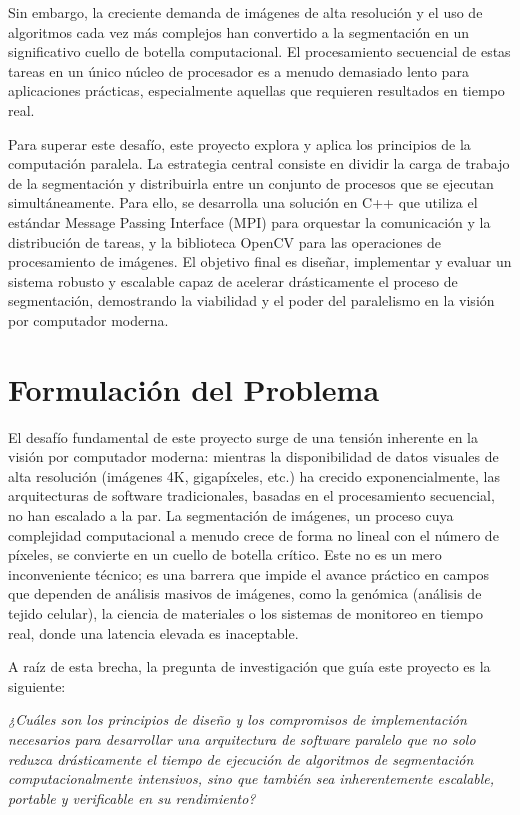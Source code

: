 \documentclass[fleqn,10pt]{article}
\begin{document}
Sin embargo, la creciente demanda de imágenes de alta resolución y el uso de algoritmos cada vez más complejos han convertido a la segmentación en un significativo cuello de botella computacional. El procesamiento secuencial de estas tareas en un único núcleo de procesador es a menudo demasiado lento para aplicaciones prácticas, especialmente aquellas que requieren resultados en tiempo real.

Para superar este desafío, este proyecto explora y aplica los principios de la computación paralela. La estrategia central consiste en dividir la carga de trabajo de la segmentación y distribuirla entre un conjunto de procesos que se ejecutan simultáneamente. Para ello, se desarrolla una solución en C++ que utiliza el estándar Message Passing Interface (MPI) para orquestar la comunicación y la distribución de tareas, y la biblioteca OpenCV para las operaciones de procesamiento de imágenes. El objetivo final es diseñar, implementar y evaluar un sistema robusto y escalable capaz de acelerar drásticamente el proceso de segmentación, demostrando la viabilidad y el poder del paralelismo en la visión por computador moderna.

\clearpage
\section{Formulación del Problema}
El desafío fundamental de este proyecto surge de una tensión inherente en la visión por computador moderna: mientras la disponibilidad de datos visuales de alta resolución (imágenes 4K, gigapíxeles, etc.) ha crecido exponencialmente, las arquitecturas de software tradicionales, basadas en el procesamiento secuencial, no han escalado a la par. La segmentación de imágenes, un proceso cuya complejidad computacional a menudo crece de forma no lineal con el número de píxeles, se convierte en un cuello de botella crítico. Este no es un mero inconveniente técnico; es una barrera que impide el avance práctico en campos que dependen de análisis masivos de imágenes, como la genómica (análisis de tejido celular), la ciencia de materiales o los sistemas de monitoreo en tiempo real, donde una latencia elevada es inaceptable.

A raíz de esta brecha, la pregunta de investigación que guía este proyecto es la siguiente:

\textit{¿Cuáles son los principios de diseño y los compromisos de implementación necesarios para desarrollar una arquitectura de software paralelo que no solo reduzca drásticamente el tiempo de ejecución de algoritmos de segmentación computacionalmente intensivos, sino que también sea inherentemente escalable, portable y verificable en su rendimiento?}
\end{document}
